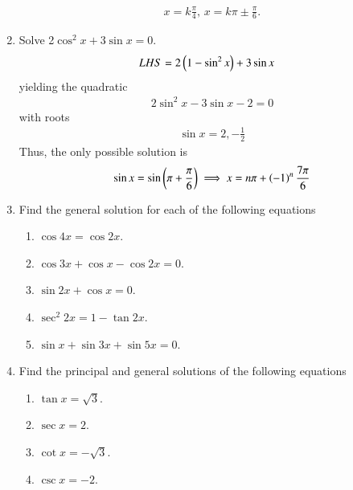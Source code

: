 \begin{enumerate}[label=\thesubsection.\arabic*,ref=\thesubsection.\theenumi]
\begin{align}
	x = k \frac{\pi}{4},\,
	x = k\pi \pm \frac{\pi}{6}.
\end{align}
%
\item Solve 2$\cos^{2}x+3\sin x=0$.
	\\
	\solution
\begin{align}
	LHS &= 2\left(1-\sin^2x\right)+3\sin x
\end{align}
%
yielding the quadratic
\begin{align}
	 2\sin^2x-3\sin x -2= 0
\end{align}
with roots
\begin{align}
	\sin x = 2, -\frac{1}{2}
\end{align}
Thus, the only possible solution is
\begin{align}
	\sin x = \sin \left(\pi + \frac{\pi}{6}\right)
	\implies x = n\pi + \left(-1\right)^n\frac{7\pi}{6}
\end{align}
\item Find the general solution for each of the following equations
\begin{enumerate}
\item $\cos4x=\cos2x$.
\item $\cos3x+\cos x-\cos2x=0$.
\item $\sin2x+\cos x=0$.
\item $\sec^{2}2x=1-\tan2x$.
\item $\sin x+\sin3x+\sin5x=0$.
\end{enumerate}
%
\item Find the principal and general solutions of the following equations
\begin{enumerate}
\item $\tan x=\sqrt 3$.
\item $\sec x=2$.
\item $\cot x=-\sqrt 3$.
\item $\csc x=-2$.
\end{enumerate}
\end{enumerate}
